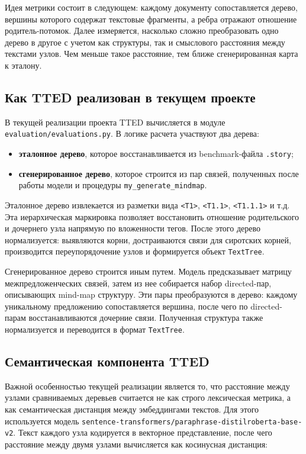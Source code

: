 \documentclass[12pt,a4paper]{article}
\begin{document}
Идея метрики состоит в следующем: каждому документу сопоставляется дерево, вершины
которого содержат текстовые фрагменты, а ребра отражают отношение родитель-потомок.
Далее измеряется, насколько сложно преобразовать одно дерево в другое с учетом как
структуры, так и смыслового расстояния между текстами узлов. Чем меньше такое
расстояние, тем ближе сгенерированная карта к эталону.

\subsection{Как TTED реализован в текущем проекте}

В текущей реализации проекта TTED вычисляется в модуле
\texttt{evaluation/evaluations.py}. В логике расчета участвуют два дерева:

\begin{itemize}
    \item \textbf{эталонное дерево}, которое восстанавливается из benchmark-файла
    \texttt{.story};
    \item \textbf{сгенерированное дерево}, которое строится из пар связей, полученных
    после работы модели и процедуры \texttt{my\_generate\_mindmap}.
\end{itemize}

Эталонное дерево извлекается из разметки вида \texttt{<T1>}, \texttt{<T1.1>},
\texttt{<T1.1.1>} и т.д. Эта иерархическая маркировка позволяет восстановить отношение
родительского и дочернего узла напрямую по вложенности тегов. После этого дерево
нормализуется: выявляются корни, достраиваются связи для сиротских корней, производится
переупорядочение узлов и формируется объект \texttt{TextTree}.

Сгенерированное дерево строится иным путем. Модель предсказывает матрицу межпредложенческих
связей, затем из нее собирается набор directed-пар, описывающих mind-map структуру. Эти
пары преобразуются в дерево: каждому уникальному предложению сопоставляется вершина, после
чего по directed-парам восстанавливаются дочерние связи. Полученная структура также
нормализуется и переводится в формат \texttt{TextTree}.

\subsection{Семантическая компонента TTED}

Важной особенностью текущей реализации является то, что расстояние между узлами
сравниваемых деревьев считается не как строго лексическая метрика, а как семантическая
дистанция между эмбеддингами текстов. Для этого используется модель
\texttt{sentence-transformers/paraphrase-distilroberta-base-v2}. Текст каждого узла
кодируется в векторное представление, после чего расстояние между двумя узлами
вычисляется как косинусная дистанция:
\end{document}
